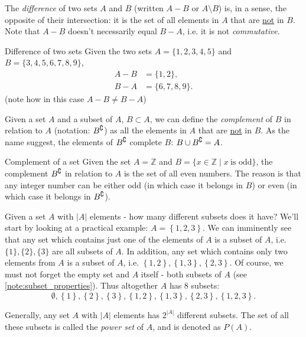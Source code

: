 The \emph{difference} of two sets $A$ and $B$ (written $A-B$ or $A\setminus B$) is, in a sense, the opposite of their intersection: it is the set of all elements in $A$ that are \underline{not} in $B$. Note that $A-B$ doesn't necessarily equal $B-A$, i.e. it is not \emph{commutative}.

\begin{example}{Difference of two sets}{}
	Given the two sets $A=\{1,2,3,4,5\}$ and $B=\{3,4,5,6,7,8,9\}$,
	\begin{align*}
		A-B &= \{1,2\},\\
		B-A &= \{6,7,8,9\}.
	\end{align*}
	(note how in this case $A-B\neq B-A$)
\end{example}

Given a set $A$ and a subset of $A$, $B\subset A$, we can define the \emph{complement} of $B$ in relation to $A$ (notation: ${B}^\complement$) as all the elements in $A$ that are \underline{not} in $B$. As the name suggest, the elements of ${B}^\complement$ complete $B$: $B\cup{B}^\complement=A$.

\begin{example}{Complement of a set}{}
	Given the set $A=\mathbb{Z}$ and $B=\{x\in \mathbb{Z} \mid x\ \text{is odd}\}$, the complement ${B}^\complement$ in relation to $A$ is the set of all even numbers. The reason is that any integer number can be either odd (in which case it belongs in $B$) or even (in which case it belongs in ${B}^\complement$).
\end{example}

Given a set $A$ with $|A|$ elements - how many different subsets does it have? We'll start by looking at a practical example: $A=\left\{ 1,2,3 \right\}$. We can imminently see that any set which contains just one of the elements of $A$ is a subset of $A$, i.e. $\{1\},\{2\},\{3\}$ are all subsets of $A$. In addition, any set which contains only two elements from $A$ is a subset of $A$, i.e. $\left\{ 1,2 \right\}, \left\{ 1,3 \right\}, \left\{ 2,3 \right\}$. Of course, we must not forget the empty set and $A$ itself - both subsets of $A$ (see \autoref{note:subset_properties}). Thus altogether $A$ has $8$ subsets:
\[
	\emptyset, \left\{ 1 \right\}, \left\{ 2 \right\}, \left\{ 3 \right\}, \left\{ 1,2 \right\}, \left\{ 1,3 \right\}, \left\{ 2,3 \right\}, \left\{ 1,2,3 \right\}.
\]

Generally, any set $A$ with $|A|$ elements has $2^{|A|}$ different subsets. The set of all these subsets is called the \emph{power set} of $A$, and is denoted as $P(A)$.

